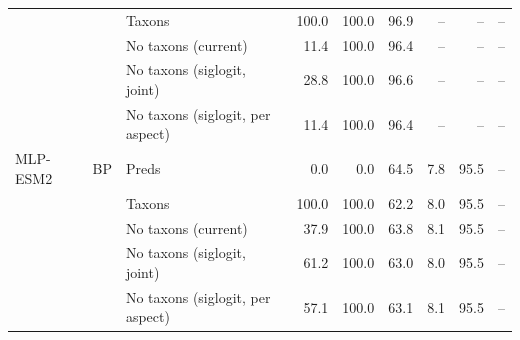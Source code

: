\begin{tabular}{lllrrrrrr}
 &  & Taxons & 100.0 & 100.0 & 96.9 & -- & -- & -- \\
 &  & No taxons (current) & 11.4 & 100.0 & 96.4 & -- & -- & -- \\
 &  & No taxons (siglogit, joint) & 28.8 & 100.0 & 96.6 & -- & -- & -- \\
 &  & No taxons (siglogit, per aspect) & 11.4 & 100.0 & 96.4 & -- & -- & -- \\
\addlinespace
MLP-ESM2 & BP & Preds & 0.0 & 0.0 & 64.5 & 7.8 & 95.5 & -- \\
 &  & Taxons & 100.0 & 100.0 & 62.2 & 8.0 & 95.5 & -- \\
 &  & No taxons (current) & 37.9 & 100.0 & 63.8 & 8.1 & 95.5 & -- \\
 &  & No taxons (siglogit, joint) & 61.2 & 100.0 & 63.0 & 8.0 & 95.5 & -- \\
 &  & No taxons (siglogit, per aspect) & 57.1 & 100.0 & 63.1 & 8.1 & 95.5 & -- \\
\bottomrule
\end{tabular}
